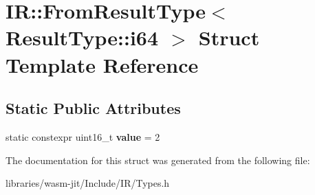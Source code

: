 \hypertarget{struct_i_r_1_1_from_result_type_3_01_result_type_1_1i64_01_4}{}\section{IR\+:\+:From\+Result\+Type$<$ Result\+Type\+:\+:i64 $>$ Struct Template Reference}
\label{struct_i_r_1_1_from_result_type_3_01_result_type_1_1i64_01_4}
\subsection*{Static Public Attributes}
\begin{DoxyCompactItemize}
\item 
\mbox{\label{struct_i_r_1_1_from_result_type_3_01_result_type_1_1i64_01_4_adca275dc7399b55e6142243d4c53097f}} 
static constexpr uint16\+\_\+t {\bfseries value} = 2
\end{DoxyCompactItemize}


The documentation for this struct was generated from the following file\+:\begin{DoxyCompactItemize}
\item 
libraries/wasm-\/jit/\+Include/\+I\+R/Types.\+h\end{DoxyCompactItemize}
